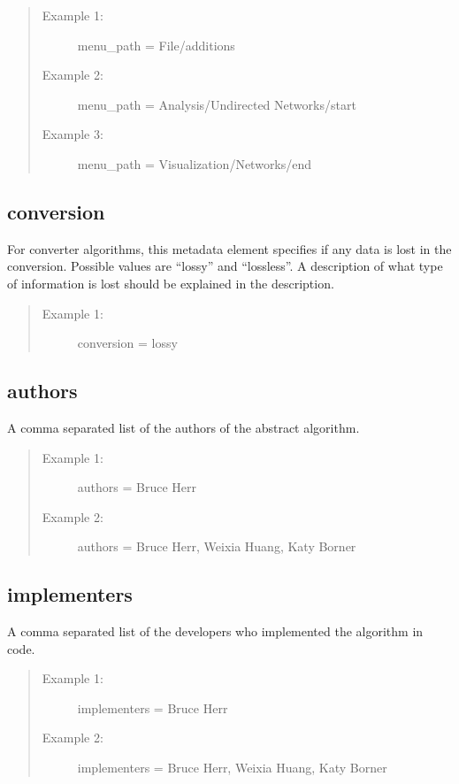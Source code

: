 \begin{quote}
\begin{description}
  \item[Example 1:] menu\_path = File/additions
  \item[Example 2:] menu\_path = Analysis/Undirected Networks/start
  \item[Example 3:] menu\_path = Visualization/Networks/end
\end{description}
\end{quote}


\subsection*{conversion}
For converter algorithms, this metadata element specifies if any data is
lost in the conversion. Possible values are ``lossy'' and ``lossless''. A
description of what type of information is lost should be explained in the
description.

\begin{quote}
\begin{description}
  \item[Example 1:] conversion = lossy 
\end{description}
\end{quote}


\subsection*{authors}
A comma separated list of the authors of the abstract algorithm.

\begin{quote}
\begin{description}
  \item[Example 1:] authors = Bruce Herr
  \item[Example 2:] authors = Bruce Herr, Weixia Huang, Katy Borner 
\end{description}
\end{quote}


\subsection*{implementers}
A comma separated list of the developers who implemented the algorithm in code.

\begin{quote}
\begin{description}
  \item[Example 1:] implementers = Bruce Herr
  \item[Example 2:] implementers = Bruce Herr, Weixia Huang, Katy Borner 
\end{description}
\end{quote}


